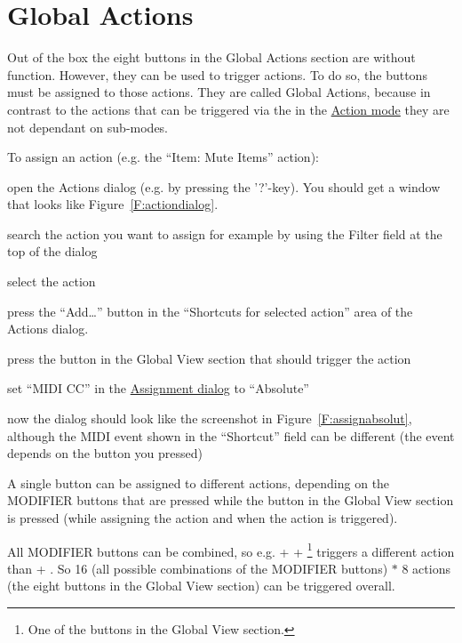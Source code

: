 \section{Global Actions}\label{globalactions}
Out of the box the eight buttons in the Global Actions section are
without function. However, they can be used to trigger \reaper
actions. To do so, the buttons must be assigned to those actions. They
are called Global Actions, because in contrast to the actions that can
be triggered via the \vpots in the \hyperref[actionmode]{Action mode}
they are not dependant on sub-modes.


\noindent
To assign an action (e.g. the ``Item: Mute Items'' action):
\begin{compactitem}
\item open the Actions dialog (e.g. by pressing the '?'-key). You
should get a window that looks like Figure~\ref{F:actiondialog}.
\item search the action you want to assign for example by using the Filter field at
the top of the dialog
\item select the action 
\item press the ``Add\ldots'' button in the ``Shortcuts for selected
  action'' area of the Actions dialog. 
\item press the button in the Global View section that should trigger
  the action
\item set ``MIDI CC'' in the \hyperref[F:assignabsolut]{Assignment dialog} to
``Absolute''
\item now the dialog should look like the screenshot in
  Figure~\ref{F:assignabsolut}, although the MIDI event shown in the
  ``Shortcut'' field can be different (the event depends on the
  button you pressed) \end{compactitem} %


A single button can be assigned to different actions, depending on the MODIFIER
buttons that are pressed while the button in the Global View section is pressed
(while assigning the action and when the action is triggered). 


All MODIFIER
buttons can be combined, so e.g. \shift + \alt + \footnote{One of the buttons in the
Global View section.} triggers a different action than \shift + . So
16 (all possible combinations of the MODIFIER buttons) $\ast$ 8 actions
(the eight buttons in the Global View section) can be triggered overall.


